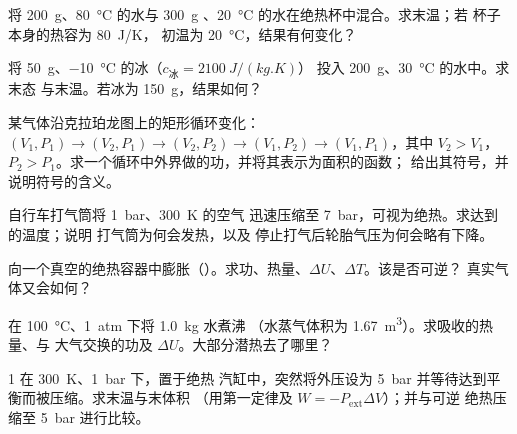 \begin{exercise}[$\star\star$]\label{exo:b1:first-law:5}
将 \qty{200}{g}、\qty{80}{\degreeCelsius} 的水与 \qty{300}{g}
、\qty{20}{\degreeCelsius} 的水在绝热杯中混合。求末温；若
杯子本身的热容为 \qty{80}{J/K}，
初温为 \qty{20}{\degreeCelsius}，结果有何变化？
\end{exercise}

\begin{exercise}[$\star\star$]\label{exo:b1:first-law:6}
将 \qty{50}{g}、\qty{-10}{\degreeCelsius} 的冰（$c_{\text{冰}} = \qty{2100}{J/(kg.K)}$）
投入 \qty{200}{g}、\qty{30}{\degreeCelsius} 的水中。求末态
与末温。若冰为 \qty{150}{g}，结果如何？
\end{exercise}

\begin{exercise}[$\star\star$]\label{exo:b1:first-law:7}
某气体沿克拉珀龙图上的矩形循环变化：$(V_1, P_1)
\to (V_2, P_1) \to (V_2, P_2) \to (V_1, P_2) \to (V_1, P_1)$，其中 $V_2 > V_1$，
$P_2 > P_1$。求一个循环中外界做的功，并将其表示为面积的函数；
给出其符号，并说明符号的含义。
\end{exercise}

\begin{exercise}[$\star\star$]\label{exo:b1:first-law:8}
自行车打气筒将 \qty{1}{bar}、\qty{300}{K} 的空气
迅速压缩至 \qty{7}{bar}，可视为绝热。求达到的温度；说明
打气筒为何会发热，以及
停止打气后轮胎气压为何会略有下降。
\end{exercise}

\begin{exercise}[$\star\star$]\label{exo:b1:first-law:9}
向一个真空的绝热容器中膨胀（）。求功、热量、$\Delta U$、$\Delta T$。该是否可逆？
真实气体又会如何？
\end{exercise}

\begin{exercise}[$\star\star\star$]\label{exo:b1:first-law:10}
在 \qty{100}{\degreeCelsius}、\qty{1}{atm} 下将 \qty{1.0}{kg} 水煮沸
（水蒸气体积为 \qty{1.67}{m^3}）。求吸收的热量、与
大气交换的功及 $\Delta U$。大部分潜热去了哪里？
\end{exercise}

\begin{exercise}[$\star\star\star$]\label{exo:b1:first-law:11}
1 在 \qty{300}{K}、\qty{1}{bar} 下，置于绝热
汽缸中，突然将外压设为
\qty{5}{bar} 并等待达到平衡而被压缩。求末温与末体积
（用第一定律及 $W = -P_{\mathrm{ext}}\Delta V$）；并与可逆
绝热压缩至 \qty{5}{bar} 进行比较。
\end{exercise}

